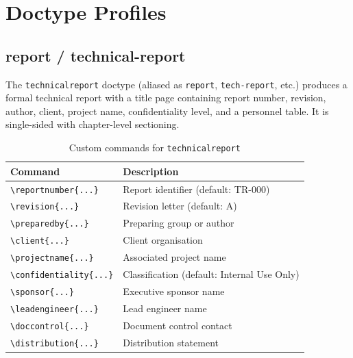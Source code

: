 \section{Doctype Profiles}

\subsection{report / technical-report}

The \texttt{technicalreport} doctype (aliased as \texttt{report},
\texttt{tech-report}, etc.) produces a formal technical report with a title
page containing report number, revision, author, client, project name,
confidentiality level, and a personnel table.  It is single-sided with
chapter-level sectioning.

\begin{table}[htbp]
    \centering
    \caption{Custom commands for \texttt{technicalreport}}
    \label{tab:techreport-commands}
    \begin{tabular}{@{} l p{8cm} @{}}
        \toprule
        \textbf{Command} & \textbf{Description} \\
        \midrule
        \texttt{\textbackslash reportnumber\{...\}}    & Report identifier (default: TR-000) \\
        \texttt{\textbackslash revision\{...\}}        & Revision letter (default: A) \\
        \texttt{\textbackslash preparedby\{...\}}      & Preparing group or author \\
        \texttt{\textbackslash client\{...\}}          & Client organisation \\
        \texttt{\textbackslash projectname\{...\}}     & Associated project name \\
        \texttt{\textbackslash confidentiality\{...\}}  & Classification (default: Internal Use Only) \\
        \texttt{\textbackslash sponsor\{...\}}         & Executive sponsor name \\
        \texttt{\textbackslash leadengineer\{...\}}    & Lead engineer name \\
        \texttt{\textbackslash doccontrol\{...\}}      & Document control contact \\
        \texttt{\textbackslash distribution\{...\}}    & Distribution statement \\
        \bottomrule
    \end{tabular}
\end{table}

